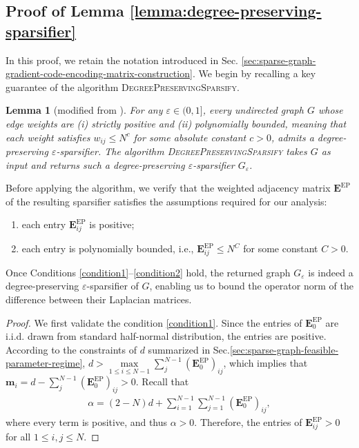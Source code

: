 \documentclass[lettersize,journal]{IEEEtran}
\newcommand{\lap}{\boldsymbol{L}}
\newcommand{\GEP}{\boldsymbol{E}^{\mathrm{EP}}}
\newtheorem{lemma}{Lemma}
\begin{document}
{\subsection{Proof of Lemma \ref{lemma:degree-preserving-sparsifier}}
\label{sec:proof-of-lemma-degree-preserving-sparsifier}
In this proof, we retain the notation introduced in Sec. \ref{sec:sparse-graph-gradient-code-encoding-matrix-construction}. We begin by recalling a key guarantee of the algorithm \textsc{DegreePreservingSparsify}.

\begin{lemma}[modified from {\cite[Theorem 3.3]{degree-preserving-sparsifier}}]
For any $\varepsilon \in (0,1]$, every undirected graph $G$ whose edge weights are
(i) strictly positive and
(ii) polynomially bounded, meaning that each weight satisfies $w_{ij} \le N^{c}$ for some absolute constant $c > 0$,
admits a degree-preserving $\varepsilon$-sparsifier. The algorithm \textsc{DegreePreservingSparsify} takes $G$ as input and returns such a degree-preserving $\varepsilon$-sparsifier $G_\varepsilon$.
\end{lemma}

Before applying the algorithm, we verify that the weighted adjacency matrix $\GEP$ of the resulting sparsifier satisfies the assumptions required for our analysis:
\begin{enumerate}
\item each entry $\GEP_{ij}$ is positive;
\label{condition1}
\item each entry is polynomially bounded, i.e., \(\GEP_{ij} \le N^{C}\) for some constant $C > 0$.
\label{condition2}
\end{enumerate}


Once Conditions \ref{condition1}–\ref{condition2} hold, the returned graph $G_\varepsilon$ is indeed a degree-preserving $\varepsilon$-sparsifier of $G$, enabling us to bound the operator norm of the difference between their Laplacian matrices.
\begin{proof}
We first validate the condition \ref{condition1}. Since the entries of $\GEP_0$ are i.i.d. drawn from standard half-normal distribution, the entries are positive. According to the constraints of $d$ summarized in Sec.\ref{sec:sparse-graph-feasible-parameter-regime}, $d> \max\limits_{1\leq i\leq N-1}\sum_{j}^{N-1}(\GEP_0)_{ij}$, which implies that $\boldsymbol{m}_i = d-\sum_{j}^{N-1}(\GEP_0)_{ij}>0$. Recall that
\begin{align*}
    \alpha = (2-N)d + \textstyle\sum_{i=1}^{N-1}\sum_{j=1}^{N-1} (\GEP_0)_{ij},
\end{align*}
where every term is positive, and thus $\alpha>0$. Therefore, the entries of $\GEP_{ij}>0$ for all $1\leq i,j\leq N$.


\end{proof}}
\end{document}
